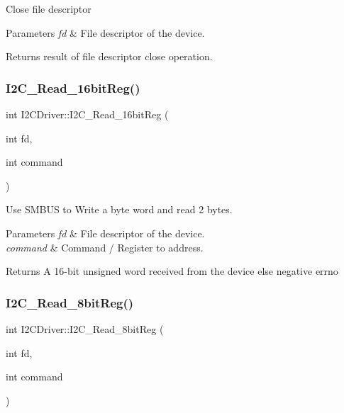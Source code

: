 Close file descriptor


\begin{DoxyParams}{Parameters}
{\em fd} & File descriptor of the device.\\
\hline
\end{DoxyParams}
\begin{DoxyReturn}{Returns}
result of file descriptor close operation. 
\end{DoxyReturn}
\mbox{\label{classI2CDriver_a8639cbc95b98be425f6b30dd591384c6}} 
\subsubsection{\texorpdfstring{I2\+C\+\_\+\+Read\+\_\+16bit\+Reg()}{I2C\_Read\_16bitReg()}}
{\footnotesize\ttfamily int I2\+C\+Driver\+::\+I2\+C\+\_\+\+Read\+\_\+16bit\+Reg (\begin{DoxyParamCaption}\item[{int}]{fd,  }\item[{int}]{command }\end{DoxyParamCaption})}

Use S\+M\+B\+US to Write a byte word and read 2 bytes.


\begin{DoxyParams}{Parameters}
{\em fd} & File descriptor of the device. \\
\hline
{\em command} & Command / Register to address.\\
\hline
\end{DoxyParams}
\begin{DoxyReturn}{Returns}
A 16-\/bit unsigned word received from the device else negative errno 
\end{DoxyReturn}
\mbox{\label{classI2CDriver_aab652313af52fe19360bc928baf80fae}} 
\subsubsection{\texorpdfstring{I2\+C\+\_\+\+Read\+\_\+8bit\+Reg()}{I2C\_Read\_8bitReg()}}
{\footnotesize\ttfamily int I2\+C\+Driver\+::\+I2\+C\+\_\+\+Read\+\_\+8bit\+Reg (\begin{DoxyParamCaption}\item[{int}]{fd,  }\item[{int}]{command }\end{DoxyParamCaption})}

